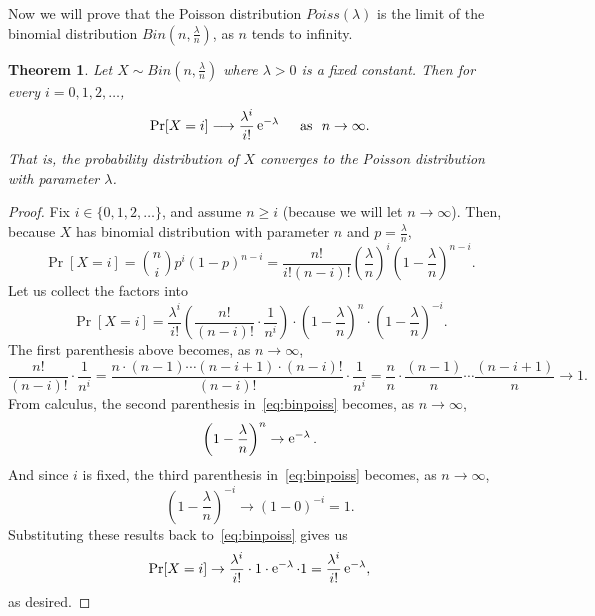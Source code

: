 \documentclass[11pt]{article}
\newcounter{thm}
\newtheorem{theorem}{Theorem}[thm]
\begin{document}
Now we will prove that the Poisson distribution $Poiss(\lambda)$ is the limit of the binomial distribution $Bin(n, \frac{\lambda}{n})$, as $n$ tends to infinity.

\begin{theorem}
Let $X \sim Bin(n, \frac{\lambda}{n})$ where $\lambda > 0$ is a fixed constant. Then for every $i = 0,1,2,\dots$,
$$\Pr[X = i] \longrightarrow \frac{\lambda^i}{i!} \mathop{\mathrm{e}}\nolimits^{-\lambda} ~~~ \text{ as } ~ n \to \infty.$$
That is, the probability distribution of $X$ converges to the Poisson distribution with parameter $\lambda$.
\end{theorem}
\begin{proof}
Fix $i \in \{0,1,2,\dots\}$, and assume $n \ge i$ (because we will let $n \to \infty$). Then, because $X$ has binomial distribution with parameter $n$ and $p = \frac{\lambda}{n}$,
$$\Pr[X = i] = {n \choose i} p^i (1-p)^{n-i}
= \frac{n!}{i! (n-i)!} \left(\frac{\lambda}{n}\right)^i \left(1-\frac{\lambda}{n}\right)^{n-i}.$$
Let us collect the factors into
\begin{equation}\label{eq:binpoiss}
\Pr[X = i]
= \frac{\lambda^i}{i!} \left( \frac{n!}{(n-i)!} \cdot \frac{1}{n^i} \right) \cdot \left(1-\frac{\lambda}{n}\right)^n \cdot \left(1-\frac{\lambda}{n}\right)^{-i}.
\end{equation}
The first parenthesis above becomes, as $n \to \infty$,
$$\frac{n!}{(n-i)!} \cdot \frac{1}{n^i} = \frac{n \cdot (n-1) \cdots (n-i+1) \cdot (n-i)!}{(n-i)!} \cdot \frac{1}{n^i}
= \frac{n}{n} \cdot \frac{(n-1)}{n} \cdots \frac{(n-i+1)}{n}
\to 1.$$
From calculus, the second parenthesis in~\eqref{eq:binpoiss} becomes, as $n \to \infty$,
$$\left(1-\frac{\lambda}{n}\right)^n \to \mathop{\mathrm{e}}\nolimits^{-\lambda}.$$
And since $i$ is fixed, the third parenthesis in~\eqref{eq:binpoiss} becomes, as $n \to \infty$,
$$\left(1-\frac{\lambda}{n}\right)^{-i} \to (1-0)^{-i} = 1.$$
Substituting these results back to~\eqref{eq:binpoiss} gives us
$$\Pr[X = i]
\to \frac{\lambda^i}{i!} \cdot 1 \cdot \mathop{\mathrm{e}}\nolimits^{-\lambda} \cdot 1 = \frac{\lambda^i}{i!} \mathop{\mathrm{e}}\nolimits^{-\lambda},$$
as desired.
\end{proof}
\end{document}
